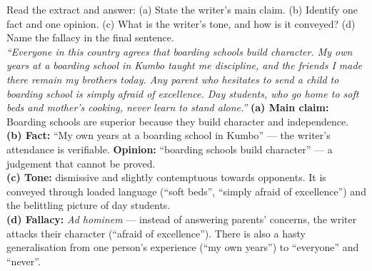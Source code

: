 \documentclass[11pt]{article}
\begin{document}
\begin{exoresolu}
Read the extract and answer: (a) State the writer's main claim. (b) Identify one fact and one opinion. (c) What is the writer's tone, and how is it conveyed? (d) Name the fallacy in the final sentence.\\
\emph{``Everyone in this country agrees that boarding schools build character. My own years at a boarding school in Kumbo taught me discipline, and the friends I made there remain my brothers today. Any parent who hesitates to send a child to boarding school is simply afraid of excellence. Day students, who go home to soft beds and mother's cooking, never learn to stand alone.''}
\tcblower
\textbf{(a) Main claim:} Boarding schools are superior because they build character and independence.\\
\textbf{(b) Fact:} ``My own years at a boarding school in Kumbo'' --- the writer's attendance is verifiable. \textbf{Opinion:} ``boarding schools build character'' --- a judgement that cannot be proved.\\
\textbf{(c) Tone:} dismissive and slightly contemptuous towards opponents. It is conveyed through loaded language (``soft beds'', ``simply afraid of excellence'') and the belittling picture of day students.\\
\textbf{(d) Fallacy:} \emph{Ad hominem} --- instead of answering parents' concerns, the writer attacks their character (``afraid of excellence''). There is also a hasty generalisation from one person's experience (``my own years'') to ``everyone'' and ``never''.
\end{exoresolu}
\end{document}
